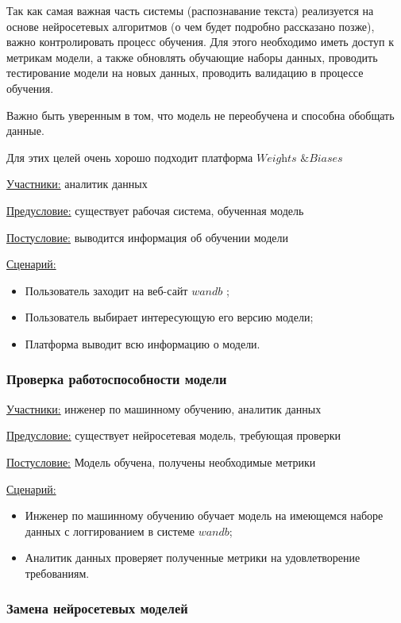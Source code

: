 Так как самая важная часть системы (распознавание текста) реализуется на основе нейросетевых алгоритмов (о чем будет подробно рассказано позже), важно контролировать процесс обучения.
Для этого необходимо иметь доступ к метрикам модели, а также обновлять обучающие наборы данных, проводить тестирование модели на новых данных, проводить валидацию в процессе обучения.

Важно быть уверенным в том, что модель не переобучена и способна обобщать данные.

Для этих целей очень хорошо подходит платформа $\textit{Weights \& Biases}$ \cite{wandb}

\underline{Участники:} аналитик данных

\underline{Предусловие:} существует рабочая система, обученная модель

\underline{Постусловие:} выводится информация об обучении модели

\underline{Сценарий:}

\begin{itemize}
    \item Пользователь заходит на веб-сайт $wandb$ \cite{wandb};
    \item Пользователь выбирает интересующую его версию модели; 
    \item Платформа выводит всю информацию о модели.
\end{itemize}

\subsubsection{Проверка работоспособности модели}

\underline{Участники:} инженер по машинному обучению, аналитик данных

\underline{Предусловие:} существует нейросетевая модель, требующая проверки

\underline{Постусловие:} Модель обучена, получены необходимые метрики

\underline{Сценарий:}

\begin{itemize}
    \item Инженер по машинному обучению обучает модель на имеющемся наборе данных с логгированием в системе $wandb$;
    \item Аналитик данных проверяет полученные метрики на удовлетворение требованиям.
\end{itemize}

\subsubsection{Замена нейросетевых моделей}

